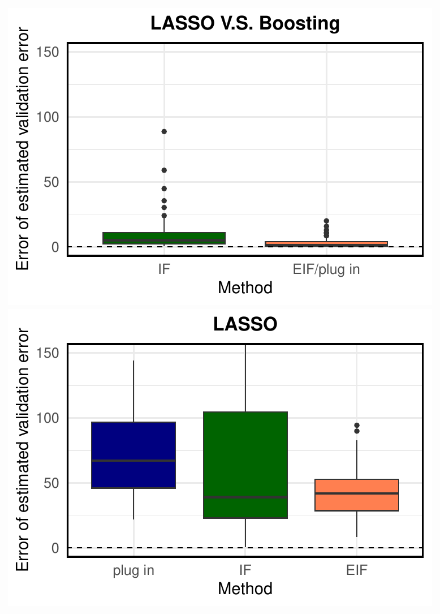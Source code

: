 \begin{figure}[ht]
\begin{minipage}{0.3\textwidth}
                \includegraphics[clip, trim = 0cm 0cm 0cm 0cm, width = \textwidth]{plot/ACIC_nonlinear_propensity_linear_HTE_estimator_error_LASSO_V.S._Boosting.pdf}
        \end{minipage}        
        \begin{minipage}{0.3\textwidth}
                \centering
                \includegraphics[clip, trim = 0cm 0cm 0cm 0cm, width = \textwidth]{plot/ACIC_nonlinear_propensity_nonlinear_HTE_estimator_error_LASSO.pdf}
        \end{minipage}
        \begin{minipage}{0.3\textwidth}
                \centering

\end{minipage}
\end{figure}
